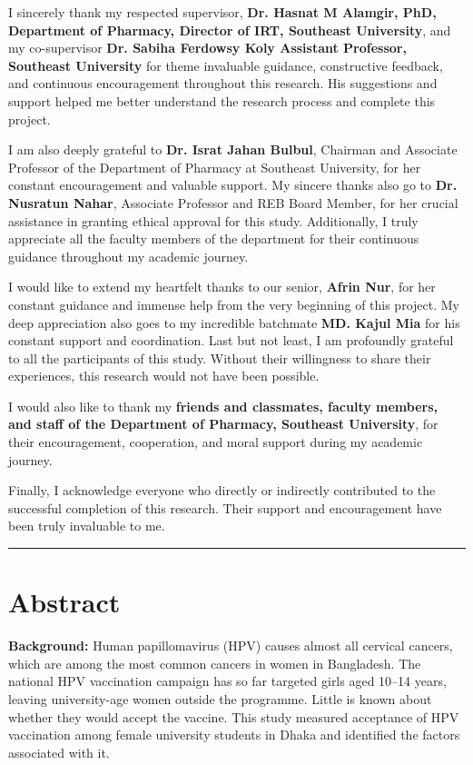 I sincerely thank my respected supervisor, \textbf{Dr. Hasnat M Alamgir, PhD, Department of Pharmacy, Director of IRT, Southeast University}, and my co-supervisor \textbf{Dr. Sabiha Ferdowsy Koly Assistant Professor, Southeast University} for theme invaluable guidance, constructive feedback, and continuous encouragement throughout this research. His suggestions and support helped me better understand the research process and complete this project.

I am also deeply grateful to \textbf{Dr. Israt Jahan Bulbul}, Chairman and Associate Professor of the Department of Pharmacy at Southeast University, for her constant encouragement and valuable support. My sincere thanks also go to \textbf{Dr. Nusratun Nahar}, Associate Professor and REB Board Member, for her crucial assistance in granting ethical approval for this study. Additionally, I truly appreciate all the faculty members of the department for their continuous guidance throughout my academic journey.

I would like to extend my heartfelt thanks to our senior, \textbf{Afrin Nur}, for her constant guidance and immense help from the very beginning of this project. My deep appreciation also goes to my incredible batchmate \textbf{MD. Kajul Mia} for his constant support and coordination. Last but not least, I am profoundly grateful to all the participants of this study. Without their willingness to share their experiences, this research would not have been possible.

I would also like to thank my \textbf{friends and classmates, faculty members, and staff of the Department of Pharmacy, Southeast University}, for their encouragement, cooperation, and moral support during my academic journey.

Finally, I acknowledge everyone who directly or indirectly contributed to the successful completion of this research. Their support and encouragement have been truly invaluable to me.

\vfill
\noindent\rule{\textwidth}{0.5pt}
\clearpage

\chapter*{Abstract}
\onehalfspacing
\textbf{Background:} Human papillomavirus (HPV) causes almost all cervical cancers, which are among the most common cancers in women in Bangladesh. The national HPV vaccination campaign has so far targeted girls aged 10--14 years, leaving university-age women outside the programme. Little is known about whether they would accept the vaccine. This study measured acceptance of HPV vaccination among female university students in Dhaka and identified the factors associated with it.

